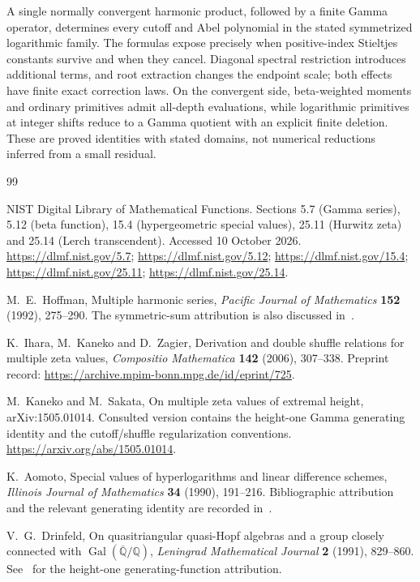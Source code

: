 \documentclass[11pt,oneside]{article}
\numberwithin{equation}{section}
\theoremstyle{definition}
\theoremstyle{remark}
\newcommand{\Q}{\mathbb Q}
\begin{document}
A single normally convergent harmonic product, followed by a finite Gamma
operator, determines every cutoff and Abel polynomial in the stated
symmetrized logarithmic family. The formulas expose precisely when
positive-index Stieltjes constants survive and when they cancel. Diagonal
spectral restriction introduces additional terms, and root extraction
changes the endpoint scale; both effects have finite exact correction laws.
On the convergent side, beta-weighted moments and ordinary primitives admit
all-depth evaluations, while logarithmic primitives at integer shifts reduce
to a Gamma quotient with an explicit finite deletion. These are proved
identities with stated domains, not numerical reductions inferred from a
small residual.

\begin{thebibliography}{99}

NIST Digital Library of Mathematical Functions.
Sections 5.7 (Gamma series), 5.12 (beta function), 15.4 (hypergeometric
special values), 25.11 (Hurwitz zeta) and 25.14 (Lerch transcendent). Accessed 10 October 2026.
\url{https://dlmf.nist.gov/5.7};
\url{https://dlmf.nist.gov/5.12};
\url{https://dlmf.nist.gov/15.4};
\url{https://dlmf.nist.gov/25.11};
\url{https://dlmf.nist.gov/25.14}.

M.~E.~Hoffman, Multiple harmonic series,
\emph{Pacific Journal of Mathematics} \textbf{152} (1992), 275--290.
The symmetric-sum attribution is also discussed in~\cite{KS}.

K.~Ihara, M.~Kaneko and D.~Zagier,
Derivation and double shuffle relations for multiple zeta values,
\emph{Compositio Mathematica} \textbf{142} (2006), 307--338.
Preprint record: \url{https://archive.mpim-bonn.mpg.de/id/eprint/725}.

M.~Kaneko and M.~Sakata, On multiple zeta values of extremal height,
arXiv:1505.01014. Consulted version contains the height-one Gamma generating
identity and the cutoff/shuffle regularization conventions.
\url{https://arxiv.org/abs/1505.01014}.

K.~Aomoto, Special values of hyperlogarithms and linear difference schemes,
\emph{Illinois Journal of Mathematics} \textbf{34} (1990), 191--216.
Bibliographic attribution and the relevant generating identity are recorded
in~\cite{KS}.

V.~G.~Drinfeld, On quasitriangular quasi-Hopf algebras and a group closely
connected with $\operatorname{Gal}(\overline{\Q}/\Q)$,
\emph{Leningrad Mathematical Journal} \textbf{2} (1991), 829--860.
See~\cite{KS} for the height-one generating-function attribution.


\end{thebibliography}
\end{document}
